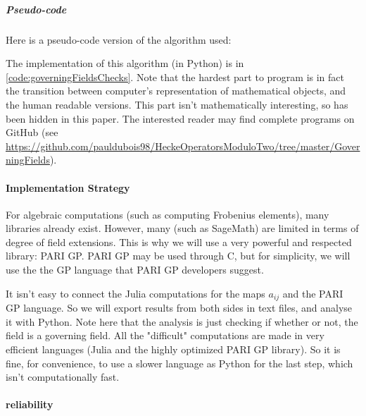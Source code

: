 \subparagraph{Pseudo-code}
\label{algo:governingFieldsChecks}
Here is a pseudo-code version of the algorithm used:
\begin{algorithmic}
	\color{CodeColor}
		\EndIf
	\EndFor
		\EndIf
	\EndFor
\end{algorithmic}
The implementation of this algorithm (in Python) is in \ref{code:governingFieldsChecks}.
Note that the hardest part to program is in fact the transition between computer's representation of mathematical objects, and the human readable versions. This part isn't mathematically interesting, so has been hidden in this paper. The interested reader may find complete programs on GitHub (see \url{https://github.com/pauldubois98/HeckeOperatorsModuloTwo/tree/master/GoverningFields}).

\paragraph{Implementation Strategy}
For algebraic computations (such as computing Frobenius elements), many libraries already exist.
However, many (such as SageMath) are limited in terms of degree of field extensions.
This is why we will use a very powerful and respected library: PARI GP.
PARI GP may be used through C, but for simplicity, we will use the the GP language that PARI GP developers suggest.

It isn't easy to connect the Julia computations for the maps $a_{ij}$ and the PARI GP language.
So we will export results from both sides in text files, and analyse it with Python.
Note here that the analysis is just checking if whether or not, the field is a governing field.
All the "difficult" computations are made in very efficient languages (Julia and the highly optimized PARI GP library).
So it is fine, for convenience, to use a slower language as Python for the last step, which isn't computationally fast.

\paragraph{reliability}
